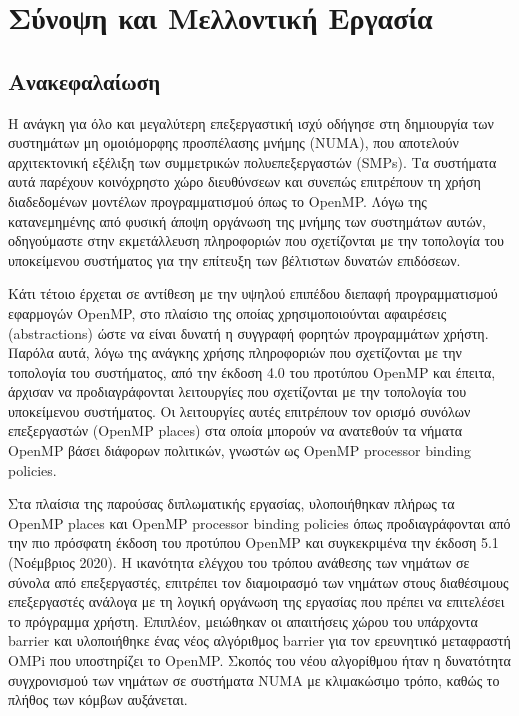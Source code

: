 \chapter{Σύνοψη και Μελλοντική Εργασία}

\section{Ανακεφαλαίωση}
Η ανάγκη για όλο και μεγαλύτερη επεξεργαστική ισχύ οδήγησε στη δημιουργία των συστημάτων μη ομοιόμορφης προσπέλασης μνήμης (NUMA), που αποτελούν αρχιτεκτονική εξέλιξη των συμμετρικών πολυεπεξεργαστών (SMPs). Τα συστήματα αυτά παρέχουν κοινόχρηστο χώρο διευθύνσεων και συνεπώς επιτρέπουν τη χρήση διαδεδομένων μοντέλων προγραμματισμού όπως το OpenMP. Λόγω της κατανεμημένης από φυσική άποψη οργάνωση της μνήμης των συστημάτων αυτών, οδηγούμαστε στην εκμετάλλευση πληροφοριών που σχετίζονται με την τοπολογία του υποκείμενου συστήματος για την επίτευξη των βέλτιστων δυνατών επιδόσεων.

Κάτι τέτοιο έρχεται σε αντίθεση με την υψηλού επιπέδου διεπαφή προγραμματισμού εφαρμογών OpenMP, στο πλαίσιο της οποίας χρησιμοποιούνται αφαιρέσεις (abstractions) ώστε να είναι δυνατή η συγγραφή φορητών προγραμμάτων χρήστη. Παρόλα αυτά, λόγω της ανάγκης χρήσης πληροφοριών που σχετίζονται με την τοπολογία του συστήματος, από την έκδοση 4.0 του προτύπου OpenMP και έπειτα, άρχισαν να προδιαγράφονται λειτουργίες που σχετίζονται με την τοπολογία του υποκείμενου συστήματος. Οι λειτουργίες αυτές επιτρέπουν τον ορισμό συνόλων επεξεργαστών (OpenMP places) στα οποία μπορούν να ανατεθούν τα νήματα OpenMP βάσει διάφορων πολιτικών, γνωστών ως OpenMP processor binding policies.

Στα πλαίσια της παρούσας διπλωματικής εργασίας, υλοποιήθηκαν πλήρως τα OpenMP places και OpenMP processor binding policies όπως προδιαγράφονται από την πιο πρόσφατη έκδοση του προτύπου OpenMP και συγκεκριμένα την έκδοση 5.1 (Νοέμβριος 2020). Η ικανότητα ελέγχου του τρόπου ανάθεσης των νημάτων σε σύνολα από επεξεργαστές, επιτρέπει τον διαμοιρασμό των νημάτων στους διαθέσιμους επεξεργαστές ανάλογα με τη λογική οργάνωση της εργασίας που πρέπει να επιτελέσει το πρόγραμμα χρήστη. Επιπλέον, μειώθηκαν οι απαιτήσεις χώρου του υπάρχοντα barrier και υλοποιήθηκε ένας νέος αλγόριθμος barrier για τον ερευνητικό μεταφραστή OMPi που υποστηρίζει το OpenMP. Σκοπός του νέου αλγορίθμου ήταν η δυνατότητα συγχρονισμού των νημάτων σε συστήματα NUMA με κλιμακώσιμο τρόπο, καθώς το πλήθος των κόμβων αυξάνεται.

